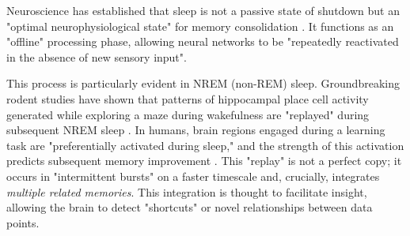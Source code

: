 Neuroscience has established that sleep is not a passive state of shutdown but an "optimal neurophysiological state" for memory consolidation \citep{wilson1994reactivation}. It functions as an "offline" processing phase, allowing neural networks to be "repeatedly reactivated in the absence of new sensory input".

This process is particularly evident in NREM (non-REM) sleep. Groundbreaking rodent studies have shown that patterns of hippocampal place cell activity generated while exploring a maze during wakefulness are "replayed" during subsequent NREM sleep \citep{wilson1994reactivation, pavlides1989placecell}. In humans, brain regions engaged during a learning task are "preferentially activated during sleep," and the strength of this activation predicts subsequent memory improvement \citep{stickgold2000tetris}. This "replay" is not a perfect copy; it occurs in "intermittent bursts" on a faster timescale and, crucially, integrates \textit{multiple related memories}. This integration is thought to facilitate insight, allowing the brain to detect "shortcuts" or novel relationships between data points.